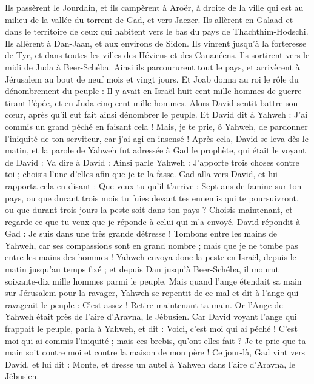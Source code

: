 \begin{multicols}{2}
Ils passèrent le Jourdain, et ils campèrent à Aroër, à droite de la ville qui est au milieu de la vallée du torrent de Gad, et vers Jaezer.
Ils allèrent en Galaad et dans le territoire de ceux qui habitent vers le bas du pays de Thachthim-Hodschi. Ils allèrent à Dan-Jaan, et aux environs de Sidon.
Ils vinrent jusqu'à la forteresse de Tyr, et dans toutes les villes des Héviens et des Cananéens. Ils sortirent vers le midi de Juda à Beer-Schéba.
Ainsi ils parcoururent tout le pays, et arrivèrent à Jérusalem au bout de neuf mois et vingt jours.
Et Joab donna au roi le rôle du dénombrement du peuple : Il y avait en Israël huit cent mille hommes de guerre tirant l'épée, et en Juda cinq cent mille hommes.
Alors David sentit battre son cœur, après qu'il eut fait ainsi dénombrer le peuple. Et David dit à Yahweh : J'ai commis un grand péché en faisant cela ! Mais, je te prie, ô Yahweh, de pardonner l'iniquité de ton serviteur, car j'ai agi en insensé !
Après cela, David se leva dès le matin, et la parole de Yahweh fut adressée à Gad le prophète, qui était le voyant de David :
Va dire à David : Ainsi parle Yahweh : J’apporte trois choses contre toi ; choisis l'une d’elles afin que je te la fasse.
Gad alla vers David, et lui rapporta cela en disant : Que veux-tu qu’il t'arrive : Sept ans de famine sur ton pays, ou que durant trois mois tu fuies devant tes ennemis qui te poursuivront, ou que durant trois jours la peste soit dans ton pays ? Choisis maintenant, et regarde ce que tu veux que je réponde à celui qui m'a envoyé.
David répondit à Gad : Je suis dans une très grande détresse ! Tombons entre les mains de Yahweh, car ses compassions sont en grand nombre ; mais que je ne tombe pas entre les mains des hommes !
Yahweh envoya donc la peste en Israël, depuis le matin jusqu'au temps fixé ; et depuis Dan jusqu'à Beer-Schéba, il mourut soixante-dix mille hommes parmi le peuple.
Mais quand l'ange étendait sa main sur Jérusalem pour la ravager, Yahweh se repentit de ce mal et dit à l'ange qui ravageait le peuple : C'est assez ! Retire maintenant ta main. Or l'Ange de Yahweh était près de l'aire d'Aravna, le Jébusien.
Car David voyant l'ange qui frappait le peuple, parla à Yahweh, et dit : Voici, c'est moi qui ai péché ! C’est moi qui ai commis l'iniquité ; mais ces brebis, qu'ont-elles fait ? Je te prie que ta main soit contre moi et contre la maison de mon père !
Ce jour-là, Gad vint vers David, et lui dit : Monte, et dresse un autel à Yahweh dans l'aire d'Aravna, le Jébusien.

\end{multicols}
